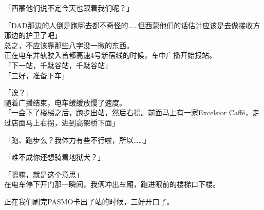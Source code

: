 「西蒙他们说不定今天也跟着我们呢？」

「DAD那边的人倒是跑哪去都不奇怪的……但西蒙他们的话估计应该是去做接收方那边的护卫了吧」\\

总之，不应该靠那些八字没一撇的东西。\\

正在电车并轨驶入首都高速4号新宿线的时候，车中广播开始报站。\\

「下一站，千駄谷站，千駄谷站」\\

「三好，准备下车」

「诶？」\\

随着广播结束，电车缓缓放慢了速度。\\

「一会下了楼梯之后，跑步出站，然后右拐。前面马上有一家Excelsior Caffé，走过店面马上右拐，进到高架桥下面」

「跑、跑步么？我体力有些不行啦，所以……」

「难不成你还想骑着地狱犬？」

「嗯嘛，就是这个意思」\\

在电车停下开门那一瞬间，我俩冲出车厢，跑进眼前的楼梯口下楼。

正在我们刷完PASMO卡出了站的时候，三好开口了。\\

